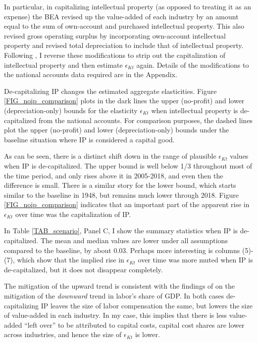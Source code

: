\documentclass[11pt]{article}
\begin{document}
In particular, in capitalizing intellectual property (as opposed to treating it as an expense) the BEA revised up the value-added of each industry by an amount equal to the sum of own-account and purchased intellectual property. This also revised gross operating surplus by incorporating own-account intellectual property and revised total depreciation to include that of intellectual property. Following \cite{ksz2020}, I reverse these modifications to strip out the capitalization of intellectual property and then estimate $\epsilon_{Kt}$ again. Details of the modifications to the national accounts data required are in the Appendix.

De-capitalizing IP changes the estimated aggregate elasticities. Figure \ref{FIG_noip_comparison} plots in the dark lines the upper (no-profit) and lower (depreciation-only) bounds for the elasticity $\epsilon_{Kt}$ when intellectual property is de-capitalized from the national accounts. For comparison purposes, the dashed lines plot the upper (no-profit) and lower (depreciation-only) bounds under the baseline situation where IP is considered a capital good. 

As can be seen, there is a distinct shift down in the range of plausible $\epsilon_{Kt}$ values when IP is de-capitalized. The upper bound is well below 1/3 throughout most of the time period, and only rises above it in 2005-2018, and even then the difference is small. There is a similar story for the lower bound, which starts similar to the baseline in 1948, but remains much lower through 2018. Figure \ref{FIG_noip_comparison} indicates that an important part of the apparent rise in $\epsilon_{Kt}$ over time was the capitalization of IP. 

In Table \ref{TAB_scenario}, Panel C, I show the summary statistics when IP is de-capitalized. The mean and median values are lower under all assumptions compared to the baseline, by about 0.03. Perhaps more interesting is columns (5)-(7), which show that the implied rise in $\epsilon_{Kt}$ over time was more muted when IP is de-capitalized, but it does not disappear completely. 

The mitigation of the upward trend is consistent with the findings of \cite{ksz2020} on the mitigation of the \textit{downward} trend in labor's share of GDP. In both cases de-capitalizing IP leaves the size of labor compensation the same, but lowers the size of value-added in each industry. In my case, this implies that there is less value-added ``left over'' to be attributed to capital costs, capital cost shares are lower across industries, and hence the size of $\epsilon_{Kt}$ is lower. 
\end{document}
